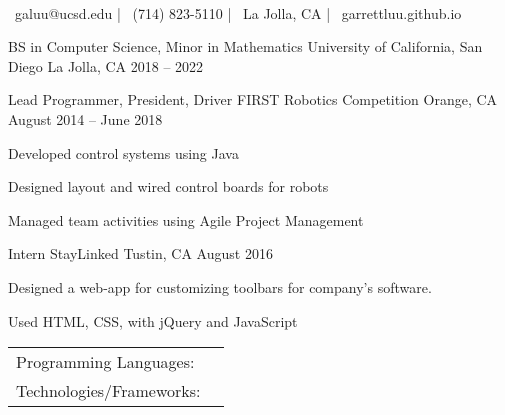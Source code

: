 \documentclass[]{awesome-cv}
\begin{document}
    
\begin{center}
	  \\
	\vspace{2mm}
	{\faEnvelope\ galuu@ucsd.edu} | {\faMobile\ (714) 823-5110} | {\faMapMarker\ La Jolla, CA} | {\faLink\ garrettluu.github.io}
\end{center}
\begin{cventries}
	\cventry
	{BS in Computer Science, Minor in Mathematics}
	{University of California, San Diego}
	{La Jolla, CA}
	{2018 – 2022}
	{}
\end{cventries}

\vspace{-2mm}
\begin{cventries}
	\cventry
	{Lead Programmer, President, Driver}
	{FIRST Robotics Competition}
	{Orange, CA}
	{August 2014 – June 2018}
	{\begin{cvitems}
		\item {Developed control systems using Java}
		\item {Designed layout and wired control boards for robots}
		\item {Managed team activities using Agile Project Management}
		\end{cvitems}}
	\cventry
	{Intern}
	{StayLinked}
	{Tustin, CA}
	{August 2016}
	{\begin{cvitems}
		\item {Designed a web-app for customizing toolbars for company’s software.}
		\item {Used HTML, CSS, with jQuery and JavaScript}
		\end{cvitems}}
\end{cventries}
\begin{cventries}
	\cventry
	{}
	{\def\arraystretch{1.15}{\begin{tabular}{ l l }
		Programming Languages:  & {\skill{ Java, C, HTML, CSS, Javascript, Kotlin}} \\
		Technologies/Frameworks:  & {\skill{ Git, Linux/Unix, Vim, PID, jQuery}} \\
		\end{tabular}}}
	{}
	{}
	{}
\end{cventries}
\end{document}
